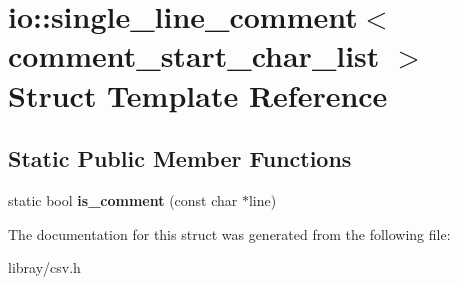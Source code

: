 \hypertarget{structio_1_1single__line__comment}{}\section{io\+:\+:single\+\_\+line\+\_\+comment$<$ comment\+\_\+start\+\_\+char\+\_\+list $>$ Struct Template Reference}
\label{structio_1_1single__line__comment}
\subsection*{Static Public Member Functions}
\begin{DoxyCompactItemize}
\item 
\mbox{\label{structio_1_1single__line__comment_ac4b029bb0efd251505f8e610cc308a92}} 
static bool {\bfseries is\+\_\+comment} (const char $\ast$line)
\end{DoxyCompactItemize}


The documentation for this struct was generated from the following file\+:\begin{DoxyCompactItemize}
\item 
libray/csv.\+h\end{DoxyCompactItemize}
